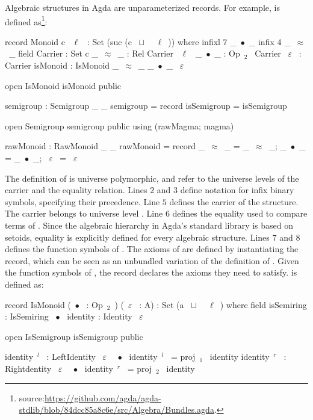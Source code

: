 Algebraic structures in Agda are unparameterized records. For example,  is defined as\footnote{source:\url{https://github.com/agda/agda-stdlib/blob/84dcc85a8c6e/src/Algebra/Bundles.agda}.}:
\begin{agdacodelnos}
record Monoid c ~$\ell$~ : Set (suc (c ~$\sqcup$~ ~$\ell$~)) where 
  infixl 7 _~$\bullet$~_
  infix 4 _~$\approx$~_
  field 
   Carrier : Set c 
   _~$\approx$~_ : Rel Carrier ~$\ell$~ 
   _~$\bullet$~_ : Op~$_2$~ Carrier 
   ~$\varepsilon$~ : Carrier 
   isMonoid : IsMonoid _~$\approx$~_ _~$\bullet$~_ ~$\varepsilon$~ 
   
   open IsMonoid isMonoid public
   
   semigroup : Semigroup _ _
   semigroup = record { isSemigroup = isSemigroup }
   
   open Semigroup semigroup public using (rawMagma; magma)
   
   rawMonoid : RawMonoid _ _
   rawMonoid = record { _~$\approx$~_ = _~$\approx$~_; _~$\bullet$~_ = _~$\bullet$~_; ~$\varepsilon$~ = ~$\varepsilon$~}
\end{agdacodelnos}
\noindent The definition of  is universe polymorphic,  and \lstmath{$\ell$} refer to the universe levels of the carrier and the equality relation. 
Lines $2$ and $3$ define notation for infix binary symbols, specifying their precedence. Line $5$ defines the carrier of the  structure. The carrier belongs to universe level . 
Line $6$ defines the equality used to compare terms of . Since the algebraic hierarchy in Agda's standard library is based on setoids, equality is explicitly defined for every algebraic structure. 
Lines $7$ and $8$ defines the function symbols of . The axioms of  are defined by instantiating the  record, which can be seen as an unbundled variation of the definition of . Given the function symbols of , the  record declares the axioms they need to satisfy.  is defined as: 
\begin{agdacode}
record IsMonoid (~$\bullet$~ : Op~$_2$~) (~$\varepsilon$~ : A) : Set (a ~$\sqcup$~ ~$\ell$~) where 
  field 
   isSemiring : IsSemiring ~$\bullet$~ 
   identity : Identity ~$\varepsilon$~
     
  open IsSemigroup isSemigroup public
     
  identity~$^l$~ : LeftIdentity ~$\varepsilon$~ ~$\bullet$~ 
  identity~$^l$~ = proj~$_1$~ identity  
  identity~$^r$~ : Rightdentity ~$\varepsilon$~ ~$\bullet$~ 
  identity~$^r$~ = proj~$_2$~ identity           
\end{agdacode}

